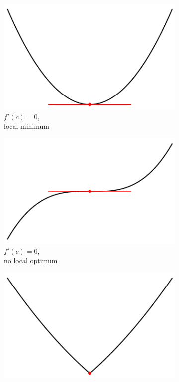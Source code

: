 \documentclass[11pt]{article}
\theoremstyle{definition} %
\begin{document}
\begin{figure}[h]
	\begin{subfigure}{0.3\textwidth}
		\centering
		\includegraphics[width=\textwidth]{figures/cp01.png}
		\caption{$f'(c) = 0$,\\local minimum}
	\end{subfigure}
	\hfill
	\begin{subfigure}{0.3\textwidth}
		\centering
		\includegraphics[width=\textwidth]{figures/cp02.png}
		\caption{$f'(c) = 0$,\\no local optimum}
	\end{subfigure}
	\hfill
	\begin{subfigure}{0.3\textwidth}
		\centering
		\includegraphics[width=\textwidth]{figures/cp03.png}

\end{subfigure}
\end{figure}
\end{document}
